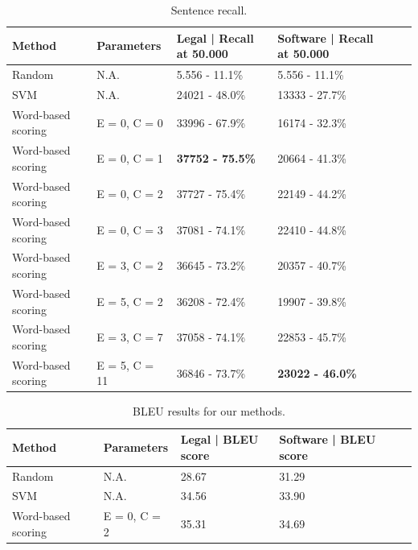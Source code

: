 \documentclass[11pt]{article}
\begin{document}
\begin{table}[t]
    \begin{tabular}{|l|l|l|l|l|l|}
    \hline
    Method & Parameters & Legal | Recall at 50.000  & Software | Recall at 50.000 \\ \hline
    Random      & N.A. & 5.556 - 11.1\%  & 5.556 - 11.1\%     \\ \hline
    SVM      & N.A.          & 24021 - 48.0\%  & 13333 - 27.7\%        \\ \hline
    Word-based scoring  & E = 0, C = 0 & 33996 - 67.9\%  & 16174 - 32.3\%        \\ \hline
    Word-based scoring  & E = 0, C = 1 & \textbf{37752 - 75.5\%}  & 20664 - 41.3\%        \\ \hline
    Word-based scoring  & E = 0, C = 2 & 37727 - 75.4\%  & 22149 - 44.2\%        \\ \hline
    Word-based scoring  & E = 0, C = 3 & 37081 - 74.1\%  & 22410 - 44.8\%        \\ \hline
    Word-based scoring  & E = 3, C = 2 & 36645 - 73.2\%  & 20357 - 40.7\%        \\ \hline
    Word-based scoring  & E = 5, C = 2 & 36208 - 72.4\%  & 19907 - 39.8\%        \\ \hline
    Word-based scoring  & E = 3, C = 7 & 37058 - 74.1\%  & 22853 - 45.7\%       \\ \hline
    Word-based scoring  & E = 5, C = 11 & 36846 - 73.7\%  & \textbf{23022 - 46.0\%}        \\ \hline
    \end{tabular}
    \caption{Sentence recall.}
   \label{t:t1}
\end{table}
\begin{table}[t]
    \begin{tabular}{|l|l|l|l|l|l|}
    \hline
    Method  & Parameters & Legal | BLEU score  & Software | BLEU score \\ \hline
    Random & N.A. & 28.67  & 31.29       \\ \hline
    SVM & N.A. & 34.56  & 33.90        \\ \hline
    Word-based scoring  & E = 0, C = 2 & 35.31  & 34.69       \\ \hline
    \end{tabular}
    \caption{BLEU results for our methods.}
\label{t:t2}
\end{table}
\end{document}
